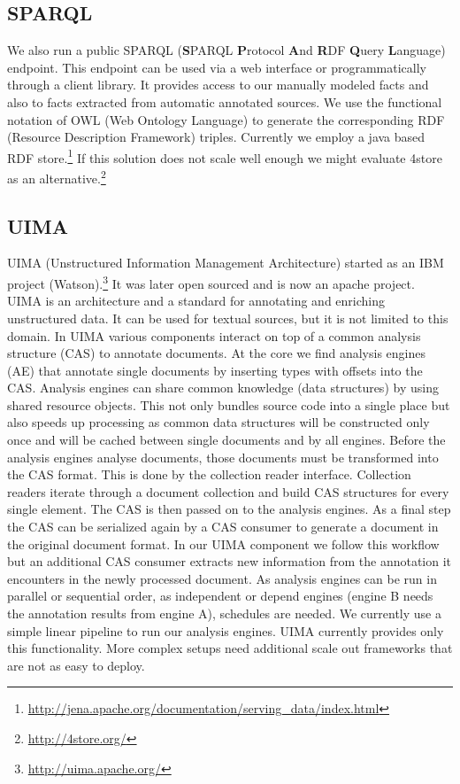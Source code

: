 \documentclass[12pt, draft]{article}
\begin{document}
\subsection{SPARQL}

We also run a public SPARQL (\textbf{S}PARQL \textbf{P}rotocol \textbf{A}nd \textbf{R}DF \textbf{Q}uery \textbf{L}anguage) endpoint.
This endpoint can be used via a web interface or programmatically through
a client library.  It provides access to our manually modeled facts
and also to facts extracted from automatic annotated sources.
We use the functional notation of OWL (Web Ontology Language) to generate
the corresponding RDF (Resource Description Framework) triples.
Currently we employ a java based RDF store.\footnote{\url{http://jena.apache.org/documentation/serving_data/index.html}}
If this solution does not scale well enough we might evaluate
4store as an alternative.\footnote{\url{http://4store.org/}}

\subsection{UIMA}

UIMA (Unstructured Information Management Architecture) started as an
 IBM project (Watson).\footnote{\url{http://uima.apache.org/}}
It was later open sourced and is now an apache project.
UIMA is an architecture and a standard for annotating and enriching unstructured data.
It can be used for textual sources, but it is not limited to this domain.
In UIMA various components interact on top of a common analysis structure (CAS)
to annotate documents. At the core we find analysis engines (AE) that
annotate single documents by inserting types with offsets into the CAS.
Analysis engines can share common knowledge (data structures) by
using shared resource objects. This not only bundles
source code into a single place but also speeds up processing as
common data structures will be constructed only once and will be cached
between single documents and by all engines.
Before the analysis engines analyse documents, those documents
must be transformed into the CAS format.
This is done by the collection reader interface. Collection readers
iterate through a document collection and build CAS structures
for every single element. The CAS is then passed on to the analysis engines.
As a final step the CAS can be serialized again
by a CAS consumer to generate a document in the original document format.
In our UIMA component we follow this workflow but an additional CAS consumer
extracts new information from the annotation it encounters
in the newly processed document.  As analysis engines can be run in
parallel or sequential order, as independent or
depend engines (engine B needs the annotation results from engine A),
schedules are needed. We currently use a simple linear pipeline to
run our analysis engines. UIMA currently provides only this functionality.
More complex setups need additional scale out frameworks that are
not as easy to deploy.
\end{document}
